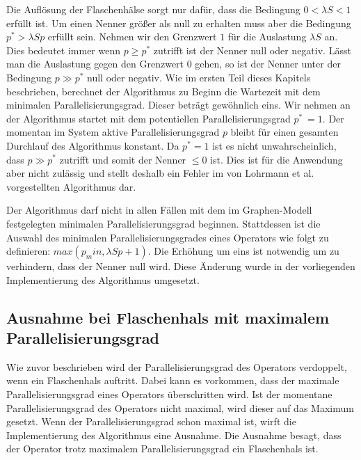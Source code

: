 Die Auflösung der Flaschenhälse sorgt nur dafür, dass die Bedingung \( 0 < \lambda S < 1 \) erfüllt ist.
Um einen Nenner größer als null zu erhalten muss aber die Bedingung \(p^\ast > \lambda S p\) erfüllt sein.
Nehmen wir den Grenzwert \(1\) für die Auslastung \(\lambda S\) an.
Dies bedeutet immer wenn \(p \geq p^\ast\) zutrifft ist der Nenner null oder negativ.
Lässt man die Auslastung gegen den Grenzwert \(0\) gehen, so ist der Nenner unter der Bedingung \(p \gg p^\ast\) null oder negativ.
Wie im ersten Teil dieses Kapitels beschrieben, berechnet der Algorithmus zu Beginn die Wartezeit mit dem minimalen Parallelisierungsgrad.
Dieser beträgt gewöhnlich eins.
Wir nehmen an der Algorithmus startet mit dem potentiellen Parallelisierungsgrad \(p^\ast\ = 1\).
Der momentan im System aktive Parallelisierungsgrad \(p\) bleibt für einen gesamten Durchlauf des Algorithmus konstant.
Da \(p^\ast = 1\) ist es nicht unwahrscheinlich, dass \(p \gg p^\ast\) zutrifft und somit der Nenner \(\leq 0\) ist.
Dies ist für die Anwendung aber nicht zulässig und stellt deshalb ein Fehler im von Lohrmann et al. vorgestellten Algorithmus dar.

Der Algorithmus darf nicht in allen Fällen mit dem im Graphen-Modell festgelegten minimalen Parallelisierungsgrad beginnen.
Stattdessen ist die Auswahl des minimalen Parallelisierungsgrades eines Operators wie folgt zu definieren: \(max(p_min, \lambda S p + 1)\).
Die Erhöhung um eins ist notwendig um zu verhindern, dass der Nenner null wird.
Diese Änderung wurde in der vorliegenden Implementierung des Algorithmus umgesetzt.

\subsection{Ausnahme bei Flaschenhals mit maximalem Parallelisierungsgrad}
Wie zuvor beschrieben wird der Parallelisierungsgrad des Operators verdoppelt, wenn ein Flaschenhals auftritt. 
Dabei kann es vorkommen, dass der maximale Parallelisierungsgrad eines Operators überschritten wird.
Ist der momentane Parallelisierungsgrad des Operators nicht maximal, wird dieser auf das Maximum gesetzt. 
Wenn der Parallelisierungsgrad schon maximal ist, wirft die Implementierung des Algorithmus eine Ausnahme.
Die Ausnahme besagt, dass der Operator trotz maximalem Parallelisierungsgrad ein Flaschenhals ist.

